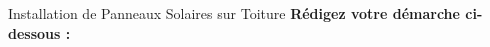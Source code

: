 \begin{sujetdnb}{Installation de Panneaux Solaires sur Toiture}
\vspace{2mm}
\noindent\textbf{Rédigez votre démarche ci-dessous :}
\lignesreponse[8]
\end{sujetdnb}
